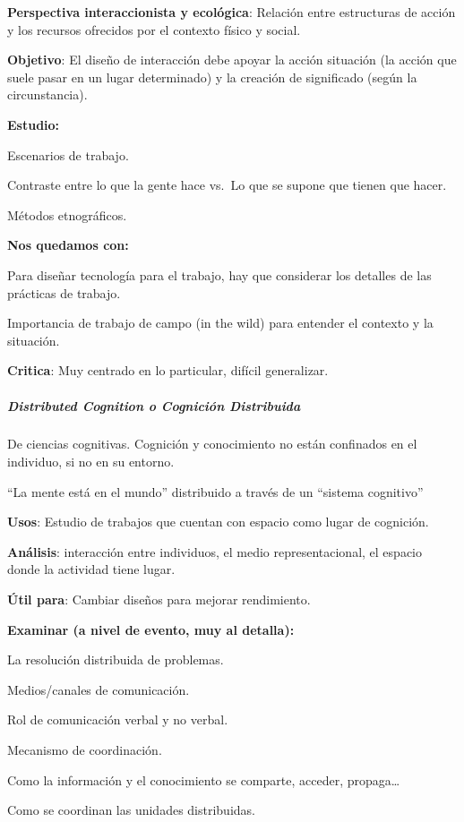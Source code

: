 \textbf{Perspectiva interaccionista y ecológica}: Relación entre
estructuras de acción y los recursos ofrecidos por el contexto físico y
social.

\textbf{Objetivo}: El diseño de interacción debe apoyar la acción
situación (la acción que suele pasar en un lugar determinado) y la
creación de significado (según la circunstancia).

\textbf{Estudio:}

Escenarios de trabajo.

Contraste entre lo que la gente hace vs.~Lo que se supone que tienen que
hacer.

Métodos etnográficos.

\textbf{Nos quedamos con:}

Para diseñar tecnología para el trabajo, hay que considerar los detalles
de las prácticas de trabajo.

Importancia de trabajo de campo (in the wild) para entender el contexto
y la situación.

\textbf{Critica}: Muy centrado en lo particular, difícil generalizar.

\hypertarget{distributed-cognition-o-cogniciuxf3n-distribuida}{%
\subparagraph{Distributed Cognition o Cognición
Distribuida}\label{distributed-cognition-o-cogniciuxf3n-distribuida}}

De ciencias cognitivas. Cognición y conocimiento no están confinados en
el individuo, si no en su entorno.

``La mente está en el mundo'' distribuido a través de un ``sistema
cognitivo''

\textbf{Usos}: Estudio de trabajos que cuentan con espacio como lugar de
cognición.

\textbf{Análisis}: interacción entre individuos, el medio
representacional, el espacio donde la actividad tiene lugar.

\textbf{Útil para}: Cambiar diseños para mejorar rendimiento.

\textbf{Examinar (a nivel de evento, muy al detalla):}

La resolución distribuida de problemas.

Medios/canales de comunicación.

Rol de comunicación verbal y no verbal.

Mecanismo de coordinación.

Como la información y el conocimiento se comparte, acceder,
propaga\ldots{}

Como se coordinan las unidades distribuidas.

